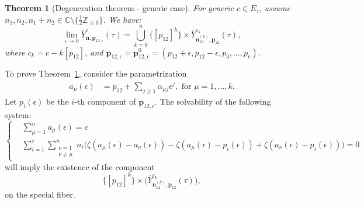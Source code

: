 \documentclass[11pt]{amsart}
\newtheorem{theorem}{Theorem}[section]
\theoremstyle{remark}
\numberwithin{equation}{section}
\begin{document}
\begin{theorem}[Degeneration theorem - generic case] \label{thm:underlying_dege_generic}
For generic $c\in E_\tau$, assume $n_1, n_2, n_1+n_2 \in \mathbb{C} \setminus \{ \tfrac{1}{2} \mathbb{Z}_{\geq 0} \}$. We have:
\[
    \lim_{\epsilon \to 0} \overline{Y}_{\mathbf{n}, \mathbf{p}_{12, \epsilon}}^c(\tau) =
    \bigcup_{k=0}^{n} \{[p_{12}]^k\} \times \overline{Y}^{c_k}_{\mathbf{n}_{12}^{(k)},\mathbf{p}_{12}}(\tau),
\]
where $c_k = c - k [p_{12}]$, and $\mathbf{p}_{12,\epsilon} = \mathbf{p}_{12,\epsilon}^0 = (p_{12}+\epsilon, p_{12}-\epsilon, p_3, \dots, p_r)$.
\end{theorem}
To prove Theorem~\ref{thm:underlying_dege_generic}, consider the parametrization
\[
\begin{split}
    a_\mu(\epsilon) &= p_{12} + \sum_{j \geq 1} \alpha_{\mu j} \epsilon^j, \mbox{ for $\mu =1,\dots,k$}.
\end{split}
\]
Let $p_i(\epsilon)$ be the $i$-th component of $\mathbf{p}_{12,\epsilon}$.
The solvability of the following system:
\begin{equation} \label{eqn:degeneration}
\begin{cases}
    &\displaystyle \sum_{\mu=1}^n a_{\mu}(\epsilon) = c 
    \\
    &\displaystyle \sum_{i = 1}^{r}  \sum_{\substack{\nu = 1\\ \nu\neq \mu}}^n  
    n_i\Big( \zeta(a_\mu(\epsilon) - a_\nu(\epsilon)) - \zeta(a_\mu(\epsilon) - p_i(\epsilon)) +  \zeta(a_\nu(\epsilon) - p_i(\epsilon)) \Big) = 0
\end{cases}
\end{equation}
will imply the existence of the component
\[
     \{[p_{12}]^k\} \times \Big( \overline{Y}^{c_k}_{\mathbf{n}_{12}^{(k)},\mathbf{p}_{12}}(\tau) \Big),
\]
on the special fiber.
\end{document}
